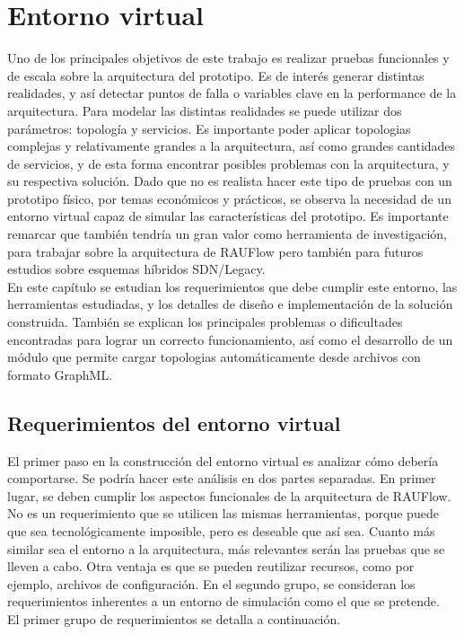 \chapter{Entorno virtual}

\graphicspath{{Chapter3/Figs/}}

Uno de los principales objetivos de este trabajo es realizar pruebas funcionales y de escala sobre la arquitectura del prototipo. Es de interés generar distintas realidades, y así detectar puntos de falla o variables clave en la performance de la arquitectura. Para modelar las distintas realidades se puede utilizar dos parámetros: topología y servicios. Es importante poder aplicar topologias complejas y relativamente grandes a la arquitectura, así como grandes cantidades de servicios, y de esta forma encontrar posibles problemas con la arquitectura, y su respectiva solución. Dado que no es realista hacer este tipo de pruebas con un prototipo físico, por temas económicos y prácticos, se observa la necesidad de un entorno virtual capaz de simular las características del prototipo. Es importante remarcar que también tendría un gran valor como herramienta de investigación, para trabajar sobre la arquitectura de RAUFlow pero también para futuros estudios sobre esquemas híbridos SDN/Legacy. \\
En este capítulo se estudian los requerimientos que debe cumplir este entorno, las herramientas estudiadas, y los detalles de diseño e implementación de la solución construida. También se explican los principales problemas o dificultades encontradas para lograr un correcto funcionamiento, así como el desarrollo de un módulo que permite cargar topologias automáticamente desde archivos con formato GraphML.

\section{Requerimientos del entorno virtual}
El primer paso en la construcción del entorno virtual es analizar cómo debería comportarse. Se podría hacer este análisis en dos partes separadas. En primer lugar, se deben cumplir los aspectos funcionales de la arquitectura de RAUFlow. No es un requerimiento que se utilicen las mismas herramientas, porque puede que sea tecnológicamente imposible, pero es deseable que así sea. Cuanto más similar sea el entorno a la arquitectura, más relevantes serán las pruebas que se lleven a cabo. Otra ventaja es que se pueden reutilizar recursos, como por ejemplo, archivos de configuración. En el segundo grupo, se consideran los requerimientos inherentes a un entorno de simulación como el que se pretende. \\
El primer grupo de requerimientos se detalla a continuación.

